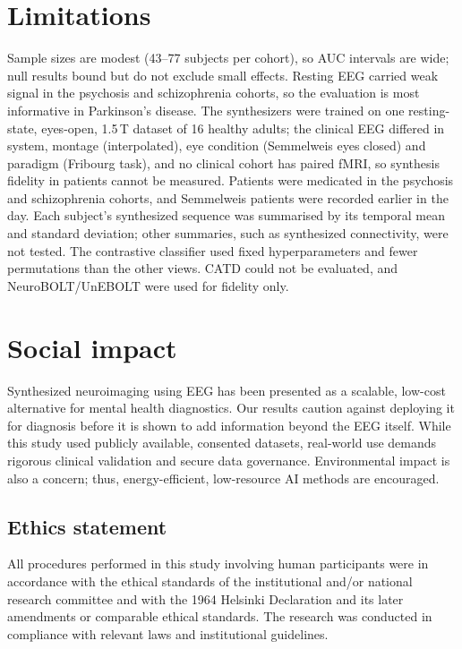 \documentclass{article}
\begin{document}
\section*{Limitations}

Sample sizes are modest (43--77 subjects per cohort), so AUC intervals are wide; null results bound but do not exclude small effects. Resting EEG carried weak signal in the psychosis and schizophrenia cohorts, so the evaluation is most informative in Parkinson's disease. The synthesizers were trained on one resting-state, eyes-open, 1.5\,T dataset of 16 healthy adults; the clinical EEG differed in system, montage (interpolated), eye condition (Semmelweis eyes closed) and paradigm (Fribourg task), and no clinical cohort has paired fMRI, so synthesis fidelity in patients cannot be measured. Patients were medicated in the psychosis and schizophrenia cohorts, and Semmelweis patients were recorded earlier in the day. Each subject's synthesized sequence was summarised by its temporal mean and standard deviation; other summaries, such as synthesized connectivity, were not tested. The contrastive classifier used fixed hyperparameters and fewer permutations than the other views. CATD could not be evaluated, and NeuroBOLT/UnEBOLT were used for fidelity only.

\section*{Social impact}

Synthesized neuroimaging using EEG has been presented as a scalable, low-cost alternative for mental health diagnostics. Our results caution against deploying it for diagnosis before it is shown to add information beyond the EEG itself. While this study used publicly available, consented datasets, real-world use demands rigorous clinical validation and secure data governance. Environmental impact is also a concern; thus, energy-efficient, low-resource AI methods are encouraged.


\subsection*{Ethics statement}

All procedures performed in this study involving human participants were in accordance with the ethical standards of the institutional and/or national research committee and with the 1964 Helsinki Declaration and its later amendments or comparable ethical standards. The research was conducted in compliance with relevant laws and institutional guidelines.
\end{document}
